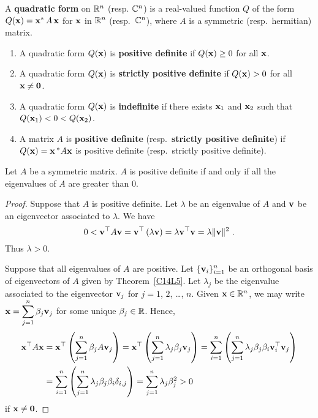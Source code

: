 \begin{defn}
A {\bfseries quadratic form} on $\mathbb{R}^n$
(resp. $\mathbb{C}^n$) is a real-valued function $Q$ of the form
$Q(\mathbf{x}) = \mathbf{x}^\ast \,A\,\mathbf{x}$ for
$\mathbf{x}$ in $\mathbb{R}^n$ (resp.\ $\mathbb{C}^n$), where $A$ is a  symmetric
(resp.\ hermitian) matrix.
\end{defn}

\begin{defn}
\begin{enumerate}
\item A quadratic form $Q(\mathbf{x})$ is
{\bfseries positive definite}
if $Q(\mathbf{x}) \geq 0$ for all $\mathbf{x}$. 
\item A quadratic form $Q(\mathbf{x})$ is
{\bfseries strictly positive definite} if $Q(\mathbf{x}) > 0$ for all $\mathbf{x} \neq \mathbf{0}$.
\item A quadratic form $Q(\mathbf{x})$ is
{\bfseries indefinite} if there
exists $\mathbf{x}_1$ and $\mathbf{x}_2$ such that
$Q(\mathbf{x}_1) < 0 < Q(\mathbf{x}_2)$. 
\item A  matrix $A$ is
{\bfseries positive definite}
(resp.\ {\bfseries strictly positive definite}) if $Q(\mathbf{x}) = \mathbf{x}\,^\ast A \mathbf{x}$ is
positive definite (resp.\ strictly positive definite).
\end{enumerate}
\end{defn}

\begin{theorem}
Let $A$ be a  symmetric matrix.  $A$ is positive definite if and
only if all the eigenvalues of $A$ are greater than 0.
\end{theorem}

\begin{proof}
 Suppose that $A$ is positive definite.  Let $\lambda$ be an
eigenvalue of $A$ and $\mathbf{v}$ be an eigenvector associated to $\lambda$. We
have
\[
0 < \mathbf{v}^\top A \mathbf{v} = \mathbf{v}^\top \left( \lambda \mathbf{v}\right) =
\lambda \mathbf{v}^\top \mathbf{v} = \lambda \|\mathbf{v}\|^2 \  .
\]
Thus $\lambda >0$.

 Suppose that all eigenvalues of $A$ are positive.
Let $\displaystyle \{\mathbf{v}_i\}_{i=1}^n$ be an orthogonal basis of
eigenvectors of $A$ given by Theorem~\ref{C14L5}.  Let $\lambda_j$ be
the eigenvalue associated to the eigenvector $\mathbf{v}_j$ for $j=1$, $2$,
\ldots, $n$.  Given $\mathbf{x} \in \mathbb{R}^n$, we may write
$\displaystyle \mathbf{x} = \sum_{j=1}^n \beta_j \mathbf{v}_j$ for some unique
$\beta_j \in \mathbb{R}$.  Hence,
\begin{align*}
\mathbf{x}^\top A \mathbf{x} &=
\mathbf{x}^\top \left( \sum_{j=1}^n \beta_j A \mathbf{v}_j \right)
= \mathbf{x}^\top \left( \sum_{j=1}^n \lambda_j \beta_j \mathbf{v}_j \right)
= \sum_{i=1}^n\left( \sum_{j=1}^n \lambda_j \beta_j \beta_i \mathbf{v}_i^\top
\mathbf{v}_j \right) \\
&= \sum_{i=1}^n\left(\sum_{j=1}^n \lambda_j \beta_j \beta_i \delta_{i,j}\right)
= \sum_{j=1}^n \lambda_j \beta_j^2 > 0
\end{align*}
if $\mathbf{x} \neq \mathbf{0}$.
\end{proof}

